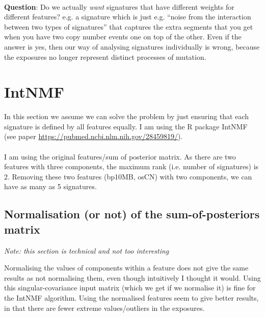 \documentclass[11pt,a4paper,roman]{article}
\begin{document}
\paragraph{}

\textbf{Question}: Do we actually \emph{want} signatures that have different weights for different features? e.g. a signature which is just e.g. ``noise from the interaction between two types of signatures'' that captures the extra segments that you get when you have two copy number events one on top of the other. Even if the answer is yes, then our way of analysing signatures individually is wrong, because the exposures no longer represent distinct processes of mutation.

\section{IntNMF}
In this section we assume we can solve the problem by just ensuring that each signature is defined by all features equally. I am using the R package IntNMF (see paper \url{https://pubmed.ncbi.nlm.nih.gov/28459819/}).

\paragraph{}

I am using the original features/sum of posterior matrix. As there are two features with three components, the maximum rank (i.e. number of signatures) is 2. Removing these two features (bp10MB, osCN) with two components, we can have as many as 5 signatures.

\subsection{Normalisation (or not) of the sum-of-posteriors matrix}
\emph{Note: this section is technical and not too interesting}

Normalising the values of components within a feature does not give the same results as not normalising them, even though intuitively I thought it would. Using this singular-covariance input matrix (which we get if we normalise it) is fine for the IntNMF algorithm. Using the normalised features seem to give better results, in that there are fewer extreme values/outliers in the exposures.

\paragraph{}
\end{document}
